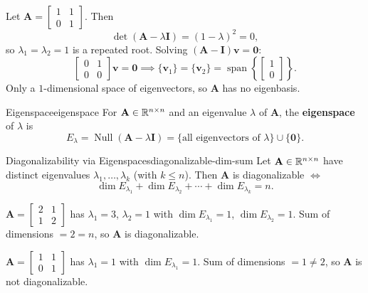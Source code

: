 \begin{example}
  Let $\mathbf{A} =
    \begin{bmatrix}
      1 & 1 \\ 0 & 1
    \end{bmatrix}
  $. Then
  \[
    \det(\mathbf{A} - \lambda \mathbf{I}) = (1 - \lambda)^2 = 0,
  \]
  so $\lambda_1 = \lambda_2 = 1$ is a repeated root. Solving $(\mathbf{A} - \mathbf{I})\mathbf{v} = \mathbf{0}$:
  \[
    \begin{bmatrix}
      0 & 1 \\ 0 & 0
    \end{bmatrix}
    \mathbf{v} = \mathbf{0}
    \implies \{\mathbf{v}_1\} = \{\mathbf{v}_2\} = \operatorname{span}\left\{
    \begin{bmatrix}
      1 \\ 0
    \end{bmatrix}
    \right\}
    .
  \]
  Only a $1$-dimensional space of eigenvectors, so $\mathbf{A}$ has no eigenbasis.
\end{example}

\begin{definition}{Eigenspace}{eigenspace}
  For $\mathbf{A} \in \mathbb{R}^{n \times n}$ and an eigenvalue $\lambda$ of $\mathbf{A}$, the \textbf{eigenspace} of $\lambda$ is
  \[
    E_\lambda = \operatorname{Null}(\mathbf{A} - \lambda \mathbf{I})
    = \{\text{all eigenvectors of $\lambda$}\} \cup \{\mathbf{0}\}.
  \]
\end{definition}

\begin{theorem}{Diagonalizability via Eigenspaces}{diagonalizable-dim-sum}
  Let $\mathbf{A} \in \mathbb{R}^{n \times n}$ have distinct eigenvalues $\lambda_1, \ldots, \lambda_k$ (with $k \leq n$). Then $\mathbf{A}$ is diagonalizable $\iff$
  \[
    \dim E_{\lambda_1} + \dim E_{\lambda_2} + \cdots + \dim E_{\lambda_k} = n.
  \]
\end{theorem}

\begin{example}
  $\mathbf{A} =
    \begin{bmatrix}
      2 & 1 \\ 1 & 2
    \end{bmatrix}
  $ has $\lambda_1 = 3$, $\lambda_2 = 1$ with $\dim E_{\lambda_1} = 1$, $\dim E_{\lambda_2} = 1$. Sum of dimensions $= 2 = n$, so $\mathbf{A}$ is diagonalizable.
\end{example}

\begin{example}
  $\mathbf{A} =
    \begin{bmatrix}
      1 & 1 \\ 0 & 1
    \end{bmatrix}
  $ has $\lambda_1 = 1$ with $\dim E_{\lambda_1} = 1$. Sum of dimensions $= 1 \neq 2$, so $\mathbf{A}$ is not diagonalizable.
\end{example}

